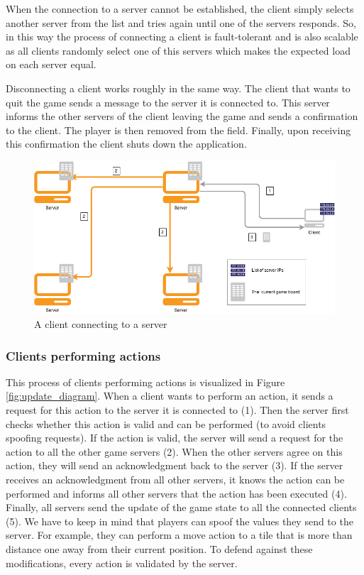 When the connection to a server cannot be established, the client simply selects another server from the list and tries again until one of the servers responds. So, in this way the process of connecting a client is fault-tolerant and is also scalable as all clients randomly select one of this servers which makes the expected load on each server equal.

Disconnecting a client works roughly in the same way. The client that wants to quit the game sends a message to the server it is connected to. This server informs the other servers of the client leaving the game and sends a confirmation to the client. The player is then removed from the field. Finally, upon receiving this confirmation the client shuts down the application.

\begin{figure}[h!]
  \centering
    \includegraphics[width=\textwidth]{diagrams/connecting-client}
    
  \caption{A client connecting to a server}
  \label{fig:connect_diagram}
\end{figure}

\subsubsection{Clients performing actions}
\label{subsubsec:clients_actions}
This process of clients performing actions is visualized in Figure \ref{fig:update_diagram}. When a client wants to perform an action, it sends a request for this action to the server it is connected to (1). Then the server first checks whether this action is valid and can be performed (to avoid clients spoofing requests). If the action is valid, the server will send a request for the action to all the other game servers (2). When the other servers agree on this action, they will send an acknowledgment back to the server (3). If the server receives an acknowledgment from all other servers, it knows the action can be performed and informs all other servers that the action has been executed (4). Finally, all servers send the update of the game state to all the connected clients (5). We have to keep in mind that players can spoof the values they send to the server. For example, they can perform a move action to a tile that is more than distance one away from their current position. To defend against these modifications, every action is validated by the server.

